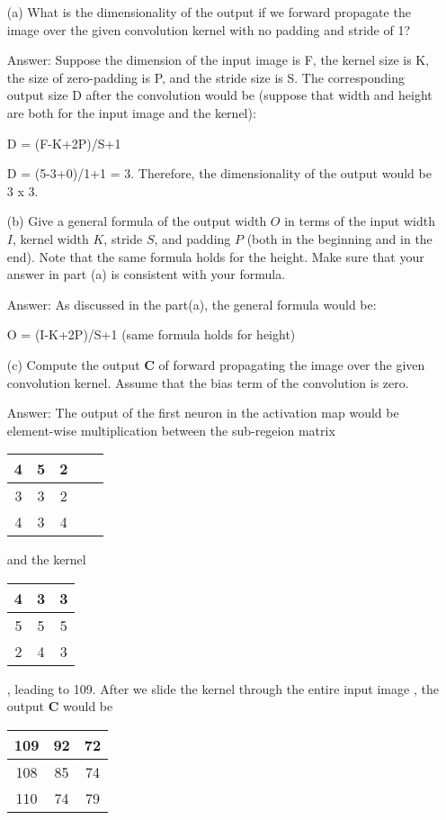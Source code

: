 \documentclass[12pt,letterpaper]{article}
\newcommand{\matr}[1]{\bm{#1}}     %
\begin{document}
\begin{itemize}
    \item[(a)] What is the dimensionality of the output if we forward propagate the image over the given convolution kernel with no padding and stride of 1? 
    
    Answer: Suppose the dimension of the input image is F, the kernel size is K, the size of zero-padding is P, and the stride size is S. The corresponding output size D after the convolution would be (suppose that width and height are both for the input image and the kernel):
    \begin{center}
        D = (F-K+2P)/S+1 
    \end{center}
    D = (5-3+0)/1+1 = 3. Therefore, the dimensionality of the output would be 3 x 3. 
    
    \item[(b)] Give a general formula of the output width $O$ in terms of the input width $I$, kernel width $K$, stride $S$, and padding $P$ (both in the beginning and in the end). Note that the same formula holds for the height. Make sure that your answer in part (a) is consistent with your formula. 
    
    Answer: As discussed in the part(a), the general formula would be:
    \begin{center}
        O = (I-K+2P)/S+1 (same formula holds for height)
    \end{center}
    
    \item[(c)] Compute the output $\matr{C}$ of forward propagating the image over the
given convolution kernel. Assume that the bias term of the convolution is zero.

    Answer: The output of the first neuron in the activation map would be element-wise multiplication between the sub-regeion matrix  
    \begin{tabular}{|c|c|c|c|c|} 
    \hline
       4 & 5 & 2 \\ \hline 
       3 & 3 & 2 \\ \hline
       4 & 3 & 4 \\ \hline 
    \end{tabular}\hspace{0.1cm} and the kernel 
    \begin{tabular}{|c|c|c|} 
    \hline
       4 & 3 & 3 \\ \hline 
       5 & 5 & 5 \\ \hline
       2 & 4 & 3 \\ \hline 
    \end{tabular}\hspace{0.1cm}, leading to 109. After we slide the kernel through the entire input image , the output $\matr{C}$ would be
    \begin{center}
        \begin{tabular}{|c|c|c|} 
    \hline
       109 & 92 & 72 \\ \hline 
       108 & 85 & 74 \\ \hline
       110 & 74 & 79 \\ \hline 
    \end{tabular}
    \end{center}
    

\end{itemize}
\end{document}

